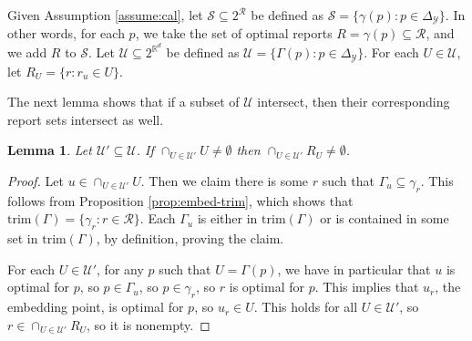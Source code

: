 \documentclass[12pt]{article}
\newcommand{\reals}{\mathbb{R}}
\newcommand{\R}{\mathcal{R}}
\newcommand{\U}{\mathcal{U}}
\newcommand{\Y}{\mathcal{Y}}
\newcommand{\trim}{\mathrm{trim}}
\newtheorem{lemma}{Lemma}
\begin{document}
Given Assumption \ref{assume:cal}, let $\mathcal{S} \subseteq 2^{\R}$ be defined as $\mathcal{S} = \{\gamma(p) : p \in \Delta_{\Y}\}$.
In other words, for each $p$, we take the set of optimal reports $R = \gamma(p) \subseteq \R$, and we add $R$ to $\mathcal{S}$.
Let $\U \subseteq 2^{\reals^d}$ be defined as $\U = \{\Gamma(p) : p \in \Delta_{\Y}\}$.
For each $U \in \U$, let $R_U = \{r: r_u \in U\}$.

The next lemma shows that if a subset of $\U$ intersect, then their corresponding report sets intersect as well.
\begin{lemma} \label{lemma:calibrated-pos}
  Let $\U' \subseteq \U$.
  If $\cap_{U\in\U'} U \neq \emptyset$ then $\cap_{U\in\U'} R_U \neq \emptyset$.
\end{lemma}
\begin{proof}
  Let $u \in \cap_{U\in\U'} U$.
  Then we claim there is some $r$ such that $\Gamma_u \subseteq \gamma_r$.
  This follows from Proposition \ref{prop:embed-trim}, which shows that $\trim(\Gamma) = \{ \gamma_r : r \in \R\}$.
  Each $\Gamma_u$ is either in $\trim(\Gamma)$ or is contained in some set in $\trim(\Gamma)$, by definition, proving the claim.

  For each $U \in \U'$, for any $p$ such that $U = \Gamma(p)$, we have in particular that $u$ is optimal for $p$, so $p \in \Gamma_u$, so $p \in \gamma_r$, so $r$ is optimal for $p$.
  This implies that $u_r$, the embedding point, is optimal for $p$, so $u_r \in U$.
  This holds for all $U \in \U'$, so $r \in \cap_{U\in\U'} R_U$, so it is nonempty.
\end{proof}
\end{document}
